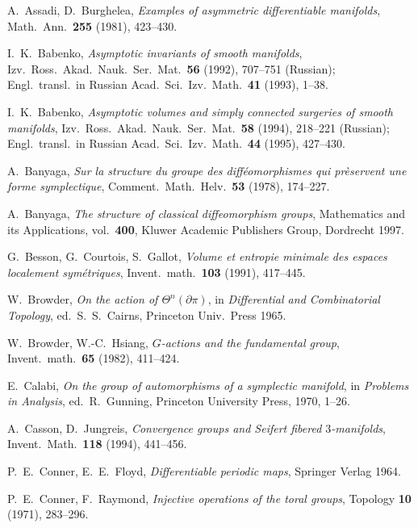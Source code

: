 \documentclass[12pt]{amsart}
\theoremstyle{definition}
\theoremstyle{remark}
\begin{document}


\begin{thebibliography}{999}

A.~Assadi, D.~Burghelea,
{\it Examples of asymmetric differentiable manifolds},
Math.~Ann.~{\bf 255} (1981), 423--430.

I.~K.~Babenko,
{\it Asymptotic invariants of smooth manifolds},
Izv.~Ross.~Akad.~Nauk.~Ser.~Mat.~{\bf 56} (1992), 707--751 (Russian);
Engl.~transl.~in Russian Acad.~Sci.~Izv.~Math.~{\bf 41} (1993), 1--38.

I.~K.~Babenko,
{\it Asymptotic volumes and simply connected surgeries of smooth manifolds},
Izv.~Ross.~Akad.~Nauk.~Ser.~Mat.~{\bf 58} (1994), 218--221 (Russian);
Engl.~transl.~in Russian Acad.~Sci.~Izv.~Math.~{\bf 44} (1995), 427--430.

A.~Banyaga,
{\it Sur la structure du groupe des diff\'eomorphismes qui
pr\`eservent une forme symplectique},
Comment.~Math.~Helv.~{\bf 53}
(1978), 174--227.

A.~Banyaga,
{\sl The structure of classical diffeomorphism groups},
Mathematics and its Applications, vol.~{\bf 400},
Kluwer Academic Publishers Group, Dordrecht 1997.

G.~Besson, G.~Courtois, S.~Gallot, {\it Volume et entropie minimale 
des espaces localement sym\'etriques}, Invent.~math.~{\bf 103}
(1991), 417--445.

W.~Browder,
{\it On the action of $\Theta^{n}(\partial\pi)$}, 
in {\sl Differential and Combinatorial Topology}, ed.~S.~S.~Cairns, 
Princeton Univ.~Press 1965.

W.~Browder, W.-C.~Hsiang,
{\it $G$-actions and the fundamental group},
Invent.~math.~{\bf 65} (1982), 411--424.

E.~Calabi,
{\it On the group of automorphisms of a symplectic manifold},
in {\sl Problems in Analysis},
ed.~R.~Gunning, Princeton University Press, 1970, 1--26.

A.~Casson, D.~Jungreis, 
{\it Convergence groups and Seifert fibered $3$-manifolds},
Invent.~Math.~{\bf 118} (1994), 441--456.

P.~E.~Conner, E.~E.~Floyd,
{\sl Differentiable periodic maps},
Springer Verlag 1964.
 
P.~E.~Conner, F.~Raymond,
{\it Injective operations of the toral groups}, 
Topology {\bf 10} (1971), 283--296.


\end{thebibliography}
\end{document}
